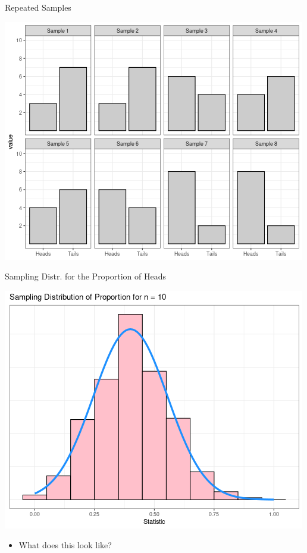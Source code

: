 \documentclass{beamer}
\begin{document}
\begin{frame}{Repeated Samples}
\begin{center}
\includegraphics[scale=0.5]{mult_coin_flip.png}
\end{center}
\end{frame}

\begin{frame}{Sampling Distr. for the Proportion of Heads}
\begin{center}
\includegraphics[scale=0.5]{p_samp_dist.png}
\end{center}
\begin{itemize}
    \item What does this look like?
\end{itemize}
\end{frame}
\end{document}
